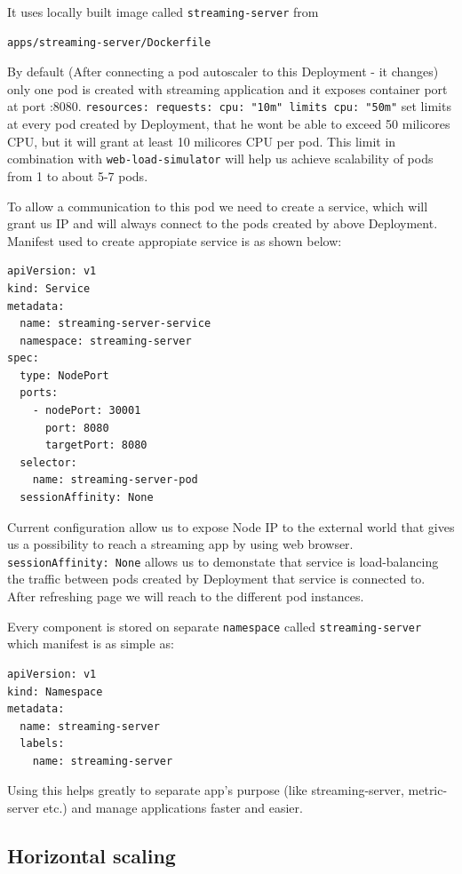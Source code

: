 \documentclass{article}
\begin{document}
It uses locally built image called \texttt{streaming-server} from

\begin{verbatim}
apps/streaming-server/Dockerfile
\end{verbatim}

By default (After connecting a pod autoscaler to this Deployment - it
changes) only one pod is created with streaming application and it
exposes container port at port :8080.
\newline\texttt{resources: requests: cpu: "10m" limits cpu: "50m"}
set limits at every pod created by Deployment, that he wont be able to
exceed 50 milicores CPU, but it will grant at least 10 milicores CPU per
pod. This limit in combination with \texttt{web-load-simulator} will
help us achieve scalability of pods from 1 to about 5-7 pods.

To allow a communication to this pod we need to create a service, which
will grant us IP and will always connect to the pods created by above
Deployment. Manifest used to create appropiate service is as shown
below:
\begin{verbatim}
apiVersion: v1
kind: Service
metadata:
  name: streaming-server-service
  namespace: streaming-server
spec:
  type: NodePort
  ports:
    - nodePort: 30001
      port: 8080
      targetPort: 8080
  selector:
    name: streaming-server-pod
  sessionAffinity: None
\end{verbatim}
Current configuration allow us to expose Node IP to the external world
that gives us a possibility to reach a streaming app by using web
browser. \texttt{sessionAffinity:\ None} allows us to demonstate that
service is load-balancing the traffic between pods created by Deployment
that service is connected to. After refreshing page we will reach to the
different pod instances.

Every component is stored on separate \texttt{namespace} called
\texttt{streaming-server} which manifest is as simple as:

\begin{verbatim}
apiVersion: v1
kind: Namespace
metadata:
  name: streaming-server
  labels:
    name: streaming-server
\end{verbatim}

Using this helps greatly to separate app's purpose (like
streaming-server, metric-server etc.) and manage
applications faster and easier.

\subsection{Horizontal scaling}\label{horizontal-scaling}
\end{document}
